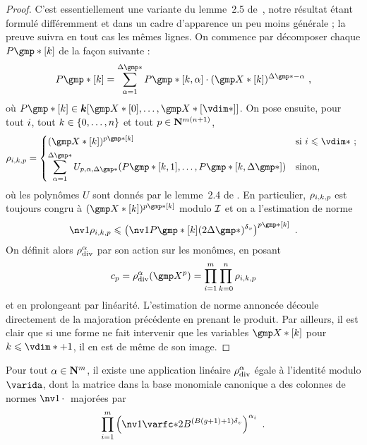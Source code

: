 \begin{proof}
  C'est essentiellement une variante du lemme~2.5 de~\cite{remivg}, notre
  résultat étant formulé différemment et dans un cadre d'apparence un peu
  moins générale ; la preuve suivra en tout cas les mêmes lignes. On commence
  par décomposer chaque \( P\mexp*[\ind] \) de la façon suivante :
  \begin{equation}
    P\mexp*[\ind]
    =
    \sum _{\alpha=1}^{\Delta\mexp*}
    P\mexp*[\ind, \alpha] \cdot (\vmp*[\ind])^{\Delta\mexp* - \alpha}
    \pmm,
  \end{equation}
  où \( P\mexp*[\ind] \in \cdn [ \vmp*[0], \dots, \vmp*[\vdim*] ] \).
  On pose ensuite, pour tout \( i \), tout
  \( k \in \{ 0, \dots, n \} \) et tout
  \( p \in {\mathbf{N}}^{m(n+1)} \),
  \begin{equation}
    \rho_{\fct, \ind, p}
    =
    \begin{dcases*}
      ( \vmp*[\ind] ) ^{p\mexp*[\ind]}
      & si \( \fct \le \vdim* \) ;
      \\
      \sum _{\alpha=1}^{\Delta\mexp*}
      U_{p, \alpha, \Delta\mexp*}
      ( P\mexp*[\ind, 1], \dots, P\mexp*[\ind, \Delta\mexp*] )
      & sinon,
    \end{dcases*}
  \end{equation}
  où les polynômes \( U \) sont donnés par le lemme~2.4 de \cite{remivg}. En
  particulier, \( \rho_{i, k, p} \) est toujours congru à
  \( ( \vmp*[\ind] ) ^{p\mexp*[\ind]} \) modulo \( \mathcal I \) et on a
  l'estimation de norme
  \begin{equation}
    \nv1{ \rho_{\fct, \ind, p} }
    \le
    \left(
    \nv1{ P\mexp*[\ind] } (2\Delta\mexp*)^\dv
    \right) ^{p\mexp*[\ind]}
    \pmm.
  \end{equation}
  On définit alors \( \rho\sb{\mathrm{div }}^\alpha \) par son action sur les monômes, en posant
  \begin{equation}
    c_p
    = \rdiv^\alpha(\vmp^p)
    = \prod\fctrange \prod\indrange \rho_{\fct, \ind, p}
  \end{equation}
  et en prolongeant par linéarité. L'estimation de norme annoncée découle
  directement de la majoration précédente en prenant le produit. Par ailleurs,
  il est clair que si une forme ne fait intervenir que les variables \(
  \vmp*[\ind] \) pour \( \ind \le \vdim* + 1 \), il en est de même de son
  image.
\end{proof}

\begin{coro} \label{c:hmat-rdiv}
  Pour tout \( \alpha \in {\mathbf{N}}^m \), il existe une application linéaire \(
    \rho\sb{\mathrm{div }}^\alpha \) égale à l'identité modulo \( \varida \), dont la matrice
  dans la base monomiale canonique a des colonnes de normes \( \nv1\truc \)
  majorées par
  \begin{equation}
    \prod\fctrange \left(
    \nv1{ \varfc* }
    2 B^{(B(\genre+1) + 1)\dv}
  \right) ^{ \alpha_\fct }
  \pmm.
  \end{equation}
\end{coro}

